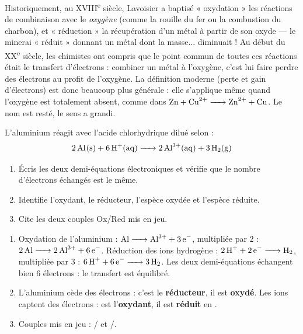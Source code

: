 \documentclass[11pt]{article}
\begin{document}
\begin{savaistu}
Historiquement, au XVIII\textsuperscript{e} siècle, Lavoisier a baptisé « oxydation » les réactions de combinaison avec le \emph{oxygène} (comme la rouille du fer ou la combustion du charbon), et « réduction » la récupération d'un métal à partir de son oxyde — le minerai « réduit » donnant un métal dont la masse... diminuait ! Au début du XX\textsuperscript{e} siècle, les chimistes ont compris que le point commun de toutes ces réactions était le transfert d'électrons : combiner un métal à l'oxygène, c'est lui faire perdre des électrons au profit de l'oxygène. La définition moderne (perte et gain d'électrons) est donc beaucoup plus générale : elle s'applique même quand l'oxygène est totalement absent, comme dans $\ce{Zn + Cu^2+ -> Zn^2+ + Cu}$. Le nom est resté, le sens a grandi.
\end{savaistu}

\begin{exercice}
L'aluminium réagit avec l'acide chlorhydrique dilué selon :
\[ \ce{2Al(s) + 6H+(aq) -> 2Al^3+(aq) + 3H2(g)} \]
\begin{enumerate}
\item Écris les deux demi-équations électroniques et vérifie que le nombre d'électrons échangés est le même.
\item Identifie l'oxydant, le réducteur, l'espèce oxydée et l'espèce réduite.
\item Cite les deux couples Ox/Red mis en jeu.
\end{enumerate}
\end{exercice}

\begin{corrige}[Exercice]
\begin{enumerate}
\item Oxydation de l'aluminium : $\ce{Al -> Al^3+ + 3e-}$, multipliée par $2$ : $\ce{2Al -> 2Al^3+ + 6e-}$. Réduction des ions hydrogène : $\ce{2H+ + 2e- -> H2}$, multipliée par $3$ : $\ce{6H+ + 6e- -> 3H2}$. Les deux demi-équations échangent bien $6$ électrons : le transfert est équilibré.
\item L'aluminium  cède des électrons : c'est le \textbf{réducteur}, il est \textbf{oxydé}. Les ions  captent des électrons :  est l'\textbf{oxydant}, il est \textbf{réduit} en .
\item Couples mis en jeu : / et /.
\end{enumerate}
\end{corrige}
\end{document}
